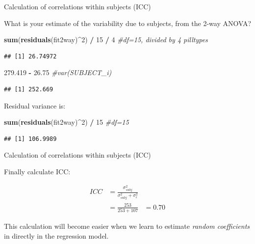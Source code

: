 \documentclass[
  ignorenonframetext,
]{beamer}
\newenvironment{Shaded}{\begin{snugshade}}{\end{snugshade}}
\newcommand{\CommentTok}[1]{\textcolor[rgb]{0.56,0.35,0.01}{\textit{#1}}}
\newcommand{\DecValTok}[1]{\textcolor[rgb]{0.00,0.00,0.81}{#1}}
\newcommand{\FloatTok}[1]{\textcolor[rgb]{0.00,0.00,0.81}{#1}}
\newcommand{\KeywordTok}[1]{\textcolor[rgb]{0.13,0.29,0.53}{\textbf{#1}}}
\newcommand{\NormalTok}[1]{#1}
\newcommand{\OperatorTok}[1]{\textcolor[rgb]{0.81,0.36,0.00}{\textbf{#1}}}
\newcommand{\StringTok}[1]{\textcolor[rgb]{0.31,0.60,0.02}{#1}}
\begin{document}
\begin{frame}[fragile]{Calculation of correlations within subjects
(ICC)}
\protect\hypertarget{calculation-of-correlations-within-subjects-icc}{}

What is your estimate of the variability due to subjects, from the 2-way
ANOVA? \footnotesize

\begin{Shaded}
\begin{Highlighting}[]
\KeywordTok{sum}\NormalTok{(}\KeywordTok{residuals}\NormalTok{(fit2way)}\OperatorTok{^}\DecValTok{2}\NormalTok{) }\OperatorTok{/}\StringTok{ }\DecValTok{15} \OperatorTok{/}\StringTok{ }\DecValTok{4} \CommentTok{#df=15, divided by 4 pilltypes}
\end{Highlighting}
\end{Shaded}

\begin{verbatim}
## [1] 26.74972
\end{verbatim}

\begin{Shaded}
\begin{Highlighting}[]
\FloatTok{279.419} \OperatorTok{-}\StringTok{ }\FloatTok{26.75} \CommentTok{#var(SUBJECT_i)}
\end{Highlighting}
\end{Shaded}

\begin{verbatim}
## [1] 252.669
\end{verbatim}

Residual variance is:

\begin{Shaded}
\begin{Highlighting}[]
\KeywordTok{sum}\NormalTok{(}\KeywordTok{residuals}\NormalTok{(fit2way)}\OperatorTok{^}\DecValTok{2}\NormalTok{) }\OperatorTok{/}\StringTok{ }\DecValTok{15} \CommentTok{#df=15}
\end{Highlighting}
\end{Shaded}

\begin{verbatim}
## [1] 106.9989
\end{verbatim}

\end{frame}

\begin{frame}{Calculation of correlations within subjects (ICC)}
\protect\hypertarget{calculation-of-correlations-within-subjects-icc-1}{}

Finally calculate ICC:

\begin{equation*}
\begin{aligned}
ICC &= \frac{\sigma_{subj}^2}{\sigma_{subj}^2 + \sigma_{\epsilon}^2} \\
    &= \frac{253}{253 + 107}
    &= 0.70
\end{aligned}
\end{equation*}

This calculation will become easier when we learn to estimate
\emph{random coefficients} in directly in the regression model.

\end{frame}
\end{document}
